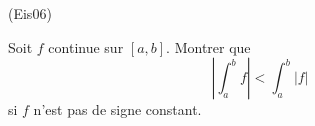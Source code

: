 \begin{tiny}(Eis06)\end{tiny}
Soit $f$ continue sur $\left[ a,b\right] $. Montrer que 
\begin{displaymath}
 \left|
\int_{a}^{b}f\right| <\int_{a}^{b}\left| f\right|
\end{displaymath}
si $f$ n'est pas de signe constant.
